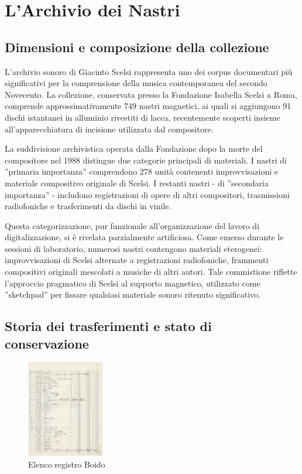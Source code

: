 
\section{L'Archivio dei Nastri}
\subsection{Dimensioni e composizione della collezione}
L'archivio sonoro di Giacinto Scelsi rappresenta uno dei corpus documentari più significativi per la comprensione della musica contemporanea del secondo Novecento. La collezione, conservata presso la Fondazione Isabella Scelsi a Roma, comprende approssimativamente 749 nastri magnetici\cite{pro:scelsitapes2007}, ai quali si aggiungono 91 dischi istantanei in alluminio rivestiti di lacca, recentemente scoperti insieme all'apparecchiatura di incisione utilizzata dal compositore\cite{pro:beracpmm4ch2011}.

La suddivisione archivistica operata dalla Fondazione dopo la morte del compositore nel 1988 distingue due categorie principali di materiali. I nastri di ''primaria importanza'' comprendono 278 unità contenenti improvvisazioni e materiale compositivo originale di Scelsi. I restanti nastri - di ''secondaria importanza'' - includono registrazioni di opere di altri compositori, trasmissioni radiofoniche e trasferimenti da dischi in vinile\cite[p. 184]{pro:beracpmm4ch2011}.

Questa categorizzazione, pur funzionale all'organizzazione del lavoro di digitalizzazione, si è rivelata parzialmente artificiosa. Come emerso durante le sessioni di laboratorio, numerosi nastri contengono materiali eterogenei: improvvisazioni di Scelsi alternate a registrazioni radiofoniche, frammenti compositivi originali mescolati a musiche di altri autori. Tale commistione riflette l'approccio pragmatico di Scelsi al supporto magnetico, utilizzato come ''sketchpad'' per fissare qualsiasi materiale sonoro ritenuto significativo\cite[p. 170]{pro:beracpmm4ch2011}.
\subsection{Storia dei trasferimenti e stato di conservazione}
\begin{figure} %
    \centering
    \includegraphics[width=0.3\textwidth]{docs/img/elenco_registro_Boido.jpg}
    \caption{Elenco registro Boido}
\end{figure}

